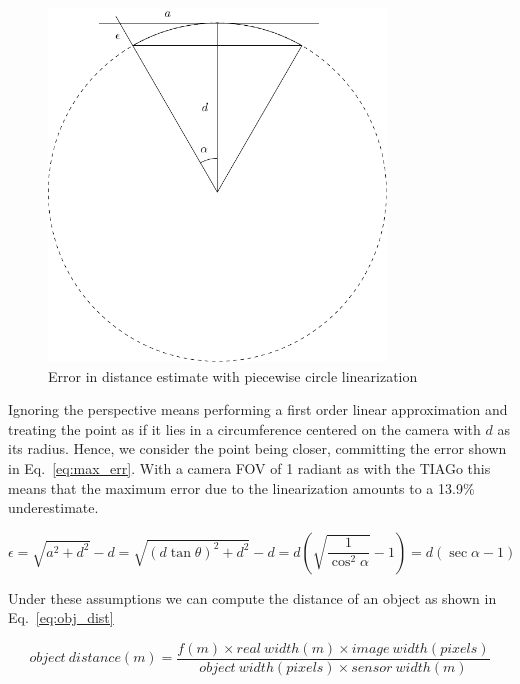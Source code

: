 \documentclass[a4paper]{article}
\begin{document}
	\begin{figure}[htpb]
		\centering
		\includegraphics[width=0.8\textwidth]{./img/linearization_error.pdf}
		\caption{Error in distance estimate with piecewise circle linearization}
		\label{fig:error}
	\end{figure}

	Ignoring the perspective means performing a first order linear
	approximation and treating the point as if it lies in a circumference
	centered on the camera with $d$ as its radius. Hence, we consider the point
	being closer, committing the error shown in Eq.~\ref{eq:max_err}. With a
	camera FOV of 1 radiant as with the TIAGo this means that the maximum error
	due to the linearization amounts to a 13.9\% underestimate.

	\begin{equation}
		\epsilon = 
		\sqrt{a^2+d^2} - d =
		\sqrt{(d\tan \theta )^2+d^2}-d =
		d\left( \sqrt{\frac{1}{\cos ^2 \alpha}}-1 \right) =
		d \left( \sec \alpha -1 \right) 
		\label{eq:max_err}
	\end{equation}


	Under these assumptions we can compute the distance of an object as shown in
	Eq.~\ref{eq:obj_dist}

	\begin{equation}\label{eq:obj_dist}
		object~distance(m) = 
		\frac{f(m) \times real~width(m) \times image~width(pixels)}
			{object~width(pixels) \times sensor~width(m)}
	\end{equation}
\end{document}

